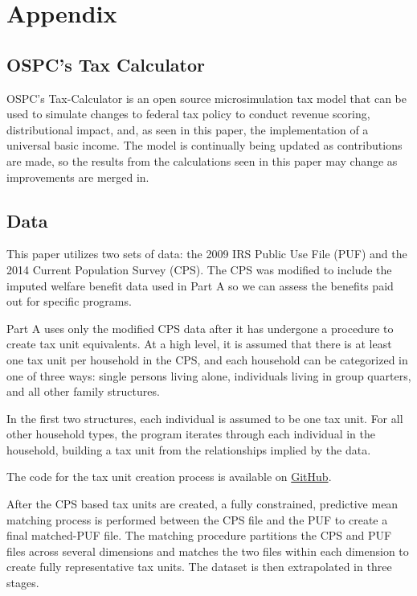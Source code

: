 \documentclass{article}
\begin{document}
\newpage
\section{Appendix}

\subsection{OSPC's Tax Calculator}
OSPC’s Tax-Calculator is an open source microsimulation tax model that can be used to simulate changes to federal tax policy to conduct revenue scoring, distributional impact, and, as seen in this paper, the implementation of a universal basic income. The model is continually being updated as contributions are made, so the results from the calculations seen in this paper may change as improvements are merged in.

\subsection{Data}
This paper utilizes two sets of data: the 2009 IRS Public Use File (PUF) and the 2014 Current Population Survey (CPS). The CPS was modified to include the imputed welfare benefit data used in Part A so we can assess the benefits paid out for specific programs.

Part A uses only the modified CPS data after it has undergone a procedure to create tax unit equivalents. At a high level, it is assumed that there is at least one tax unit per household in the CPS, and each household can be categorized in one of three ways: single persons living alone, individuals living in group quarters, and all other family structures.

In the first two structures, each individual is assumed to be one tax unit. For all other household types, the program iterates through each individual in the household, building a tax unit from the relationships implied by the data.

The code for the tax unit creation process is available on \href{https://github.com/open-source-economics/taxdata}{GitHub}.

After the CPS based tax units are created, a fully constrained, predictive mean matching process is performed between the CPS file and the PUF to create a final matched-PUF file. The matching procedure partitions the CPS and PUF files across several dimensions and matches the two files within each dimension to create fully representative tax units. The dataset is then extrapolated in three stages.
\end{document}
